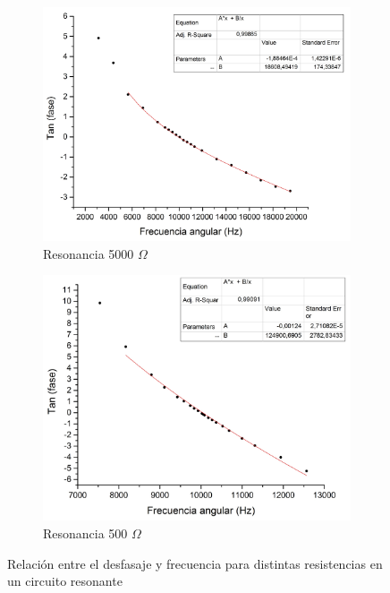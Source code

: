 \documentclass[11pt,a4paper]{article}
\begin{document}
\begin{figure}[h!]
\begin{subfigure}{0.5\textwidth}
\includegraphics[scale=0.34]{RLC_RES_5000_Tan(fase)vsF}
  \caption{Resonancia 5000 $\Omega$}
  \label{subfig:RES_D.a}
\end{subfigure}
\begin{subfigure}{0.5\textwidth}
\includegraphics[scale=0.34]{RLC_RES_500_Tan(fase)vsF}
  \caption{Resonancia 500 $\Omega$}
  \label{subfig:RES_D.b}
\end{subfigure}
  \caption{Relación entre el desfasaje y frecuencia para distintas resistencias en un circuito resonante}
  \label{fig:RES_D}
\end{figure}
\end{document}
